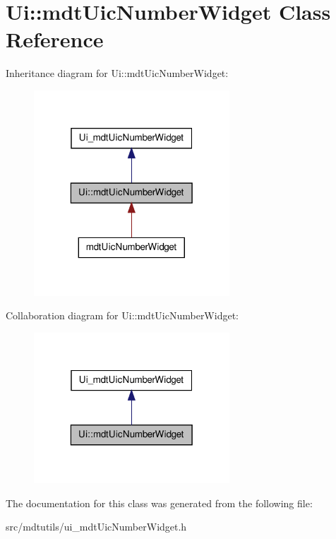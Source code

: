 \hypertarget{class_ui_1_1mdt_uic_number_widget}{
\section{Ui::mdtUicNumberWidget Class Reference}
\label{class_ui_1_1mdt_uic_number_widget}
}


Inheritance diagram for Ui::mdtUicNumberWidget:\nopagebreak
\begin{figure}[H]
\begin{center}
\leavevmode
\includegraphics[width=208pt]{class_ui_1_1mdt_uic_number_widget__inherit__graph}
\end{center}
\end{figure}


Collaboration diagram for Ui::mdtUicNumberWidget:\nopagebreak
\begin{figure}[H]
\begin{center}
\leavevmode
\includegraphics[width=208pt]{class_ui_1_1mdt_uic_number_widget__coll__graph}
\end{center}
\end{figure}


The documentation for this class was generated from the following file:\begin{DoxyCompactItemize}
\item 
src/mdtutils/ui\_\-mdtUicNumberWidget.h\end{DoxyCompactItemize}

